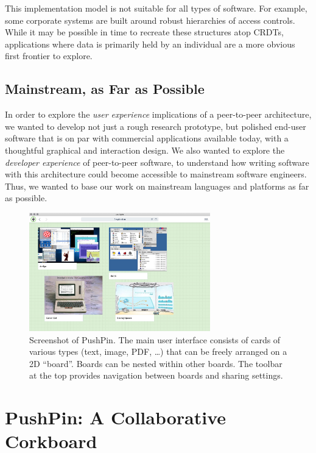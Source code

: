 \documentclass[sigplan,10pt]{acmart}
\begin{document}
This implementation model is not suitable for all types of software. For example, some corporate systems are built around robust hierarchies of access controls. While it may be possible in time to recreate these structures atop CRDTs, applications where data is primarily held by an individual are a more obvious first frontier to explore.   

\subsection{Mainstream, as Far as Possible}

In order to explore the \emph{user experience} implications of a peer-to-peer architecture, we wanted to develop not just a rough research prototype, but polished end-user software that is on par with commercial applications available today, with a thoughtful graphical and interaction design.
We also wanted to explore the \emph{developer experience} of peer-to-peer software, to understand how writing software with this architecture could become accessible to mainstream software engineers.
Thus, we wanted to base our work on mainstream languages and platforms as far as possible.

\begin{figure}
    \centering
    \includegraphics[width=0.7\textwidth]{pushpin.jpg}
    \caption{Screenshot of PushPin. The main user interface consists of cards of various types (text, image, PDF, \dots) that can be freely arranged on a 2D ``board''. Boards can be nested within other boards. The toolbar at the top provides navigation between boards and sharing settings.}
    \label{fig:pushpin}
\end{figure}

\section{PushPin: A Collaborative Corkboard}\label{sec:pushpin}
\end{document}
